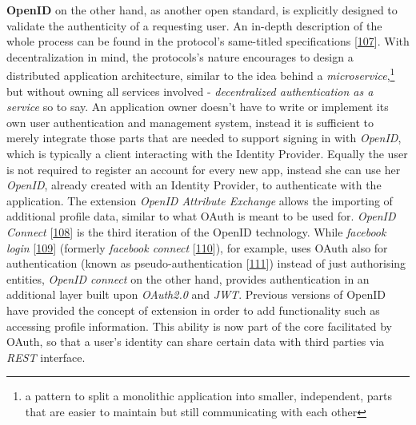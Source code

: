 \documentclass[12pt,english,a4paper,titlepage,cleardoublepage=empty,dottedtoc]{report}
\begin{document}
\textbf{OpenID} on the other hand, as another open standard, is
explicitly designed to validate the authenticity of a requesting user.
An in-depth description of the whole process can be found in the
protocol's same-titled specifications
{[}\protect\hyperlink{ref-web_spec_openid-spec-index}{107}{]}. With
decentralization in mind, the protocols's nature encourages to design a
distributed application architecture, similar to the idea behind a
\emph{microservice},\footnote{a pattern to split a monolithic
  application into smaller, independent, parts that are easier to
  maintain but still communicating with each other} but without owning
all services involved - \emph{decentralized authentication as a service}
so to say. An application owner doesn't have to write or implement its
own user authentication and management system, instead it is sufficient
to merely integrate those parts that are needed to support signing in
with \emph{OpenID}, which is typically a client interacting with the
Identity Provider. Equally the user is not required to register an
account for every new app, instead she can use her \emph{OpenID},
already created with an Identity Provider, to authenticate with the
application. The extension \emph{OpenID Attribute Exchange} allows the
importing of additional profile data, similar to what OAuth is meant to
be used for. \emph{OpenID Connect}
{[}\protect\hyperlink{ref-web_spec_openid-connect-1}{108}{]} is the
third iteration of the OpenID technology. While \emph{facebook login}
{[}\protect\hyperlink{ref-web_docs_facebook-login}{109}{]} (formerly
\emph{facebook connect}
{[}\protect\hyperlink{ref-web_2017_wikipedia_facebook-connect}{110}{]}),
for example, uses OAuth also for authentication (known as
pseudo-authentication
{[}\protect\hyperlink{ref-web_2017_wikipedia_openid-vs-pseudo-oauth}{111}{]})
instead of just authorising entities, \emph{OpenID connect} on the other
hand, provides authentication in an additional layer built upon
\emph{OAuth2.0} and \emph{JWT}. Previous versions of OpenID have
provided the concept of extension in order to add functionality such as
accessing profile information. This ability is now part of the core
facilitated by OAuth, so that a user's identity can share certain data
with third parties via \emph{REST} interface.
\end{document}
